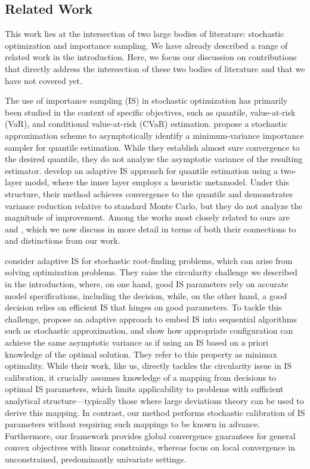 \documentclass[11pt,a4paper]{article}
\theoremstyle{definition}
\begin{document}
\subsection{Related Work}
\label{subsec:related:work}

This work lies at the intersection of two large bodies of literature: stochastic optimization and importance sampling. We have already described a range of related work in the introduction. Here, we focus our discussion on contributions that directly address the intersection of these two bodies of literature and that we have not covered yet.

The use of importance sampling (IS) in stochastic optimization has primarily been studied in the context of specific objectives, such as quantile, value-at-risk (VaR), and conditional value-at-risk (CVaR) estimation. \citet{egloff2010quantile} propose a stochastic approximation scheme to asymptotically identify a minimum-variance importance sampler for quantile estimation. While they establish almost sure convergence to the desired quantile, they do not analyze the asymptotic variance of the resulting estimator. \citet{pan2020adaptive} develop an adaptive IS approach for quantile estimation using a two-layer model, where the inner layer employs a heuristic metamodel. Under this structure, their method achieves convergence to the quantile and demonstrates variance reduction relative to standard Monte Carlo, but they do not analyze the magnitude of improvement. Among the works most closely related to ours are \citet{he2023adaptive} and \citet{Bardou2009computing}, which we now discuss in more detail in terms of both their connections to and distinctions from our work. 


\citet{he2023adaptive} consider adaptive IS for stochastic root-finding problems, which can arise from solving optimization problems. They raise the circularity challenge we described in the introduction, where, on one hand, good IS parameters rely on accurate model specifications, including the decision, while, on the other hand, a good decision relies on efficient IS that hinges on good parameters. To tackle this challenge, \citet{he2023adaptive} propose an adaptive approach to embed IS into sequential algorithms such as stochastic approximation, and show how appropriate configuration can achieve the same asymptotic variance as if using an IS based on a priori knowledge of the optimal solution. They refer to this property as minimax optimality. While their work, like us, directly tackles the circularity issue in IS calibration, it crucially assumes knowledge of a mapping from decisions to optimal IS parameters, which limits applicability to problems with sufficient analytical structure—typically those where large deviations theory can be used to derive this mapping. In contrast, our method performs stochastic calibration of IS parameters without requiring such mappings to be known in advance. Furthermore, our framework provides global convergence guarantees for general convex objectives with linear constraints, whereas \citet{he2023adaptive} focus on local convergence in unconstrained, predominantly univariate settings.
\end{document}
